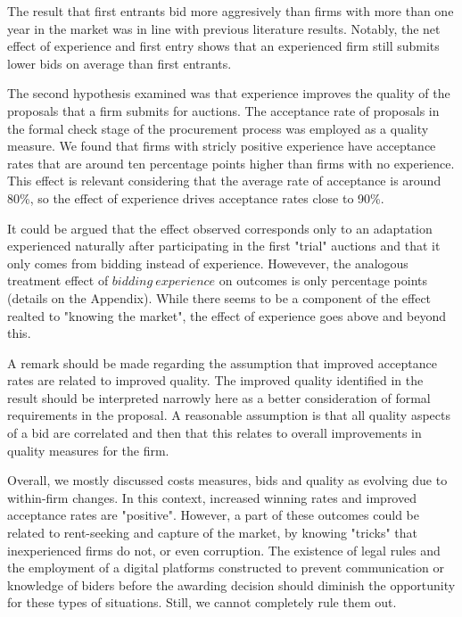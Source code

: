 The result that first entrants bid more aggresively than firms with more than one year in the market was in line with previous literature results. Notably, the net effect of experience and first entry shows that an experienced firm still submits lower bids on average than first entrants.

The second hypothesis examined was that experience improves the quality of the proposals that a firm submits for auctions. The acceptance rate of proposals in the formal check stage of the procurement process was employed as a quality measure. We found that firms with stricly positive experience have acceptance rates that are around ten percentage points higher than firms with no experience. This effect is relevant considering that the average rate of acceptance is around 80\%, so the effect of experience drives acceptance rates close to 90\%.

It could be argued that the effect observed corresponds only to an adaptation experienced naturally after participating in the first "trial" auctions and that it only comes from bidding instead of experience. Howevever, the analogous treatment effect of $bidding \ experience$ on outcomes is only percentage points (details on the Appendix). While there seems to be a component of the effect realted to "knowing the market", the effect of experience goes above and beyond this.

A remark should be made regarding the assumption that improved acceptance rates are related to improved quality. The improved quality identified in the result should be interpreted narrowly here as a better consideration of formal requirements in the proposal. A reasonable assumption is that all quality aspects of a bid are correlated and then that this relates to overall improvements in quality measures for the firm.

Overall, we mostly discussed costs measures, bids and quality as evolving due to within-firm changes. In this context, increased winning rates and improved acceptance rates are "positive". However, a part of these outcomes could be related to rent-seeking and capture of the market, by knowing "tricks" that inexperienced firms do not, or even corruption. The existence of legal rules  and the employment of a digital platforms constructed to prevent communication or knowledge of biders before the awarding decision should diminish the opportunity for these types of situations. Still, we cannot completely rule them out.

